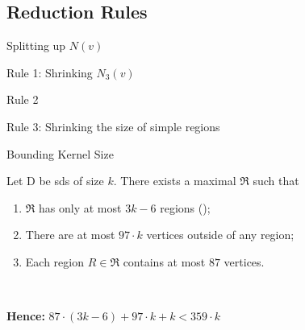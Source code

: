 \subsection{Reduction Rules}

\begin{frame}[c]{Splitting up $N(v)$}

\end{frame}

\begin{frame}[c]{Rule 1: Shrinking $N_3(v)$}

\end{frame}

\begin{frame}[c]{Rule 2}

\end{frame}

\begin{frame}[c]{Rule 3: Shrinking the size of simple regions}

\end{frame}

\begin{frame}[c]{Bounding Kernel Size}

    Let D be sds of size $k$. There exists a maximal \dreg $\mathfrak{R}$ such that

    \begin{enumerate}
        \item $\mathfrak{R}$ has only at most $3 k - 6$ regions (\cite{Alber2004});
        \item There are at most $97 \cdot k$ vertices outside of any region;
        \item Each region  $R \in \mathfrak{R}$ contains at most $87$ vertices.
    \end{enumerate}

    \begin{figure}[!ht]
    \end{figure}
\

    \textbf{Hence: } $87 \cdot (3k - 6) + 97 \cdot k + k < 359 \cdot k$



\end{frame}

